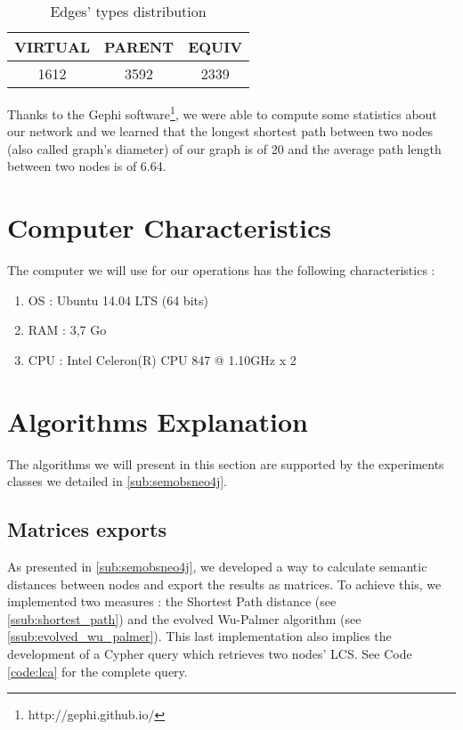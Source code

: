 \begin{table}[!h]
\centering
\begin{tabular}{|c|c|c|}
\hline
{\bf VIRTUAL} & {\bf PARENT} & {\bf EQUIV} \\ \hline
1612          & 3592         & 2339      \\ \hline
\end{tabular}
\caption{Edges' types distribution}
\label{table:edges}
\end{table}



Thanks to the Gephi software\footnote{http://gephi.github.io/}, we were able to compute some statistics about our network and we learned that the longest shortest path between two nodes (also called graph's diameter) of our graph is of 20 and the average path length between two nodes is of 6.64.

\section{Computer Characteristics} %
\label{sec:computer_characteristics}
The computer we will use for our operations has the following characteristics :
\begin{enumerate}
  \item OS : Ubuntu 14.04 LTS (64 bits)
  \item RAM : 3,7 Go
  \item CPU : Intel Celeron(R) CPU 847 @ 1.10GHz x 2
\end{enumerate}

\section{Algorithms Explanation}
The algorithms we will present in this section are supported by the experiments classes we detailed in \ref{sub:semobsneo4j}.

\subsection{Matrices exports} %
\label{sub:matrices_exports}
As presented in \ref{sub:semobsneo4j}, we developed a way to calculate semantic distances between nodes and export the results as matrices. To achieve this, we implemented two measures : the Shortest Path distance (see \ref{ssub:shortest_path}) and the evolved Wu-Palmer algorithm (see \ref{ssub:evolved_wu_palmer}). This last implementation also implies the development of a Cypher query which retrieves two nodes' LCS. See Code \ref{code:lca} for the complete query.\\


